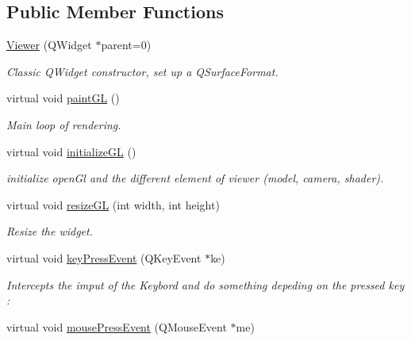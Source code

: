 \subsection*{Public Member Functions}
\begin{DoxyCompactItemize}
\item 
\mbox{\hyperlink{class_viewer_a6a1f845092e1d4407adabb550e40431b}{Viewer}} (Q\+Widget $\ast$parent=0)
\begin{DoxyCompactList}\small\item\em Classic Q\+Widget constructor, set up a Q\+Surface\+Format. \end{DoxyCompactList}\item 
\mbox{\label{class_viewer_a0acb833945df75a7547a8aa43d10511a}} 
virtual void \mbox{\hyperlink{class_viewer_a0acb833945df75a7547a8aa43d10511a}{paint\+GL}} ()
\begin{DoxyCompactList}\small\item\em Main loop of rendering. \end{DoxyCompactList}\item 
\mbox{\label{class_viewer_a56ba84e76143655770007b413c56bb2d}} 
virtual void \mbox{\hyperlink{class_viewer_a56ba84e76143655770007b413c56bb2d}{initialize\+GL}} ()
\begin{DoxyCompactList}\small\item\em initialize open\+Gl and the different element of viewer (model, camera, shader). \end{DoxyCompactList}\item 
virtual void \mbox{\hyperlink{class_viewer_a03c6a6d6c43c9fbcc26d11cb944d4875}{resize\+GL}} (int width, int height)
\begin{DoxyCompactList}\small\item\em Resize the widget. \end{DoxyCompactList}\item 
virtual void \mbox{\hyperlink{class_viewer_a1e9fa3e1484e31424260db80826d24a5}{key\+Press\+Event}} (Q\+Key\+Event $\ast$ke)
\begin{DoxyCompactList}\small\item\em Intercepts the imput of the Keybord and do something depeding on the pressed key \+: \end{DoxyCompactList}\item 
virtual void \mbox{\hyperlink{class_viewer_aa8cd58104b20ce3ba5ec502eb09afca6}{mouse\+Press\+Event}} (Q\+Mouse\+Event $\ast$me)

\end{DoxyCompactItemize}
